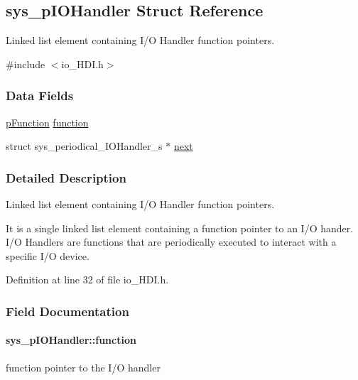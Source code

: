 \hypertarget{structsys__pIOHandler}{}\subsection{sys\+\_\+p\+I\+O\+Handler Struct Reference}
\label{structsys__pIOHandler}


Linked list element containing I/\+O Handler function pointers.  




{\ttfamily \#include $<$io\+\_\+\+H\+D\+I.\+h$>$}

\subsubsection*{Data Fields}
\begin{DoxyCompactItemize}
\item 
\hyperlink{definitions_8h_aed53e618f2025481fbe48a5098f70079}{p\+Function} \hyperlink{structsys__pIOHandler_a91f4ad2f0e84b5332bf5bcb400fe30da}{function}
\item 
struct sys\+\_\+periodical\+\_\+\+I\+O\+Handler\+\_\+s $\ast$ \hyperlink{structsys__pIOHandler_a681bf25935fbdeb7a06a9f1dd47c9dff}{next}
\end{DoxyCompactItemize}


\subsubsection{Detailed Description}
Linked list element containing I/\+O Handler function pointers. 

It is a single linked list element containing a function pointer to an I/\+O hander. I/\+O Handlers are functions that are periodically executed to interact with a specific I/\+O device. 

Definition at line 32 of file io\+\_\+\+H\+D\+I.\+h.



\subsubsection{Field Documentation}
\hypertarget{structsys__pIOHandler_a91f4ad2f0e84b5332bf5bcb400fe30da}{}
\paragraph[{function}]{ sys\+\_\+p\+I\+O\+Handler\+::function}\label{structsys__pIOHandler_a91f4ad2f0e84b5332bf5bcb400fe30da}
function pointer to the I/\+O handler 

